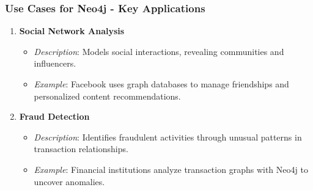 \documentclass[aspectratio=169]{beamer}
\begin{document}
\begin{frame}[fragile]
    \frametitle{Use Cases for Neo4j - Key Applications}
    \begin{enumerate}
        \item \textbf{Social Network Analysis}
            \begin{itemize}
                \item \textit{Description}: Models social interactions, revealing communities and influencers.
                \item \textit{Example}: Facebook uses graph databases to manage friendships and personalized content recommendations.
            \end{itemize}
        
        \item \textbf{Fraud Detection}
            \begin{itemize}
                \item \textit{Description}: Identifies fraudulent activities through unusual patterns in transaction relationships.
                \item \textit{Example}: Financial institutions analyze transaction graphs with Neo4j to uncover anomalies.
            \end{itemize}
    \end{enumerate}
\end{frame}
\end{document}
